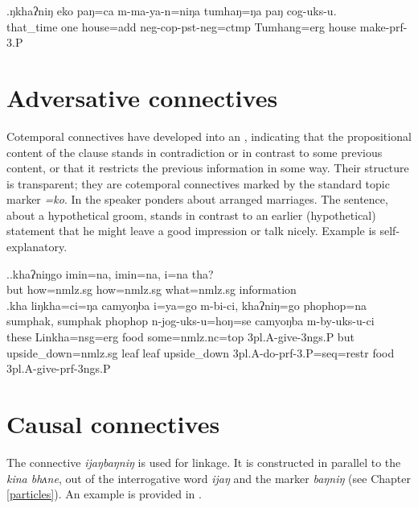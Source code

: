 \exg.ŋkhaʔniŋ eko paŋ=ca         m-ma-ya-n=niŋa tumhaŋ=ŋa   paŋ  cog-uks-u.\\
that\_time one house{\sc =add} {\sc neg-cop-pst-neg=ctmp} Tumhang{\sc =erg} house make{\sc -prf-3.P}\\
 


\section{Adversative connectives}

Cotemporal connectives have developed into an , indicating that the propositional content of the clause stands in contradiction or in contrast to some previous content, or that it restricts the previous information in some way. Their structure is transparent; they are cotemporal connectives marked by the standard topic marker \emph{=ko}. In \Next[a] the speaker ponders about arranged marriages. The sentence, about  a hypothetical groom, stands in contrast to an earlier (hypothetical) statement that he might leave a good impression or talk nicely. Example  \Next[b] is self-explanatory.

\ex.\ag.khaʔniŋgo imin=na,       imin=na,       i=na           tha?\\
but how{\sc =nmlz.sg} how{\sc =nmlz.sg} what{\sc =nmlz.sg} information\\
  
\bg.kha liŋkha=ci=ŋa camyoŋba i=ya=go m-bi-ci, khaʔniŋ=go phophop=na sumphak, sumphak phophop n-jog-uks-u=hoŋ=se camyoŋba m-by-uks-u-ci\\
these Linkha{\sc =nsg=erg} food some{\sc =nmlz.nc=top} {\sc 3pl.A-}give{\sc -3ngs.P} but upside\_down{\sc =nmlz.sg} leaf leaf upside\_down  {\sc 3pl.A-}do{\sc -prf-3.P=seq=restr} food {\sc 3pl.A-}give{\sc -prf-3ngs.P}\\
 

\section{Causal connectives}

The connective \emph{ijaŋbaŋniŋ}  is used for  linkage. It is constructed in parallel to the  \emph{kina bhʌne}, out of the interrogative word \emph{ijaŋ}  and the  marker \emph{baŋniŋ} (see Chapter \ref{particles}). An example is provided in \Next.

